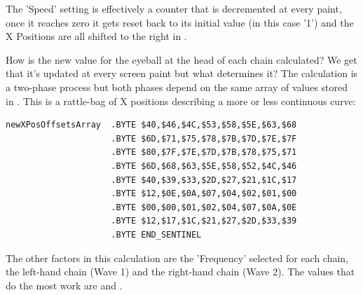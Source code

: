 The 'Speed' setting is effectively a counter that is decremented at every paint, once it reaches zero it gets reset back to 
its initial value (in this case '1') and the X Positions are all shifted to the right in .

How is the new value for the eyeball at the head of each chain calculated? We get that it's updated at every screen paint
but what determines it? The calculation is a two-phase process but both phases depend on the same array of values stored
in . This is a rattle-bag of X positions describing a more or less continuous curve:

\begin{lstlisting}[caption=Notice that the values start at \icode{\$40}\, rise gradually to \icode{\$80}\, back to \icode{\$00} and then
back up to \icode{\$40} again.]
newXPosOffsetsArray  .BYTE $40,$46,$4C,$53,$58,$5E,$63,$68
                     .BYTE $6D,$71,$75,$78,$7B,$7D,$7E,$7F
                     .BYTE $80,$7F,$7E,$7D,$7B,$78,$75,$71
                     .BYTE $6D,$68,$63,$5E,$58,$52,$4C,$46
                     .BYTE $40,$39,$33,$2D,$27,$21,$1C,$17
                     .BYTE $12,$0E,$0A,$07,$04,$02,$01,$00
                     .BYTE $00,$00,$01,$02,$04,$07,$0A,$0E
                     .BYTE $12,$17,$1C,$21,$27,$2D,$33,$39
                     .BYTE END_SENTINEL
\end{lstlisting}

The other factors in this calculation are the 'Frequency' selected for each chain, the left-hand chain (Wave 1) and the right-hand
chain (Wave 2). The values that do the most work are  and . 

